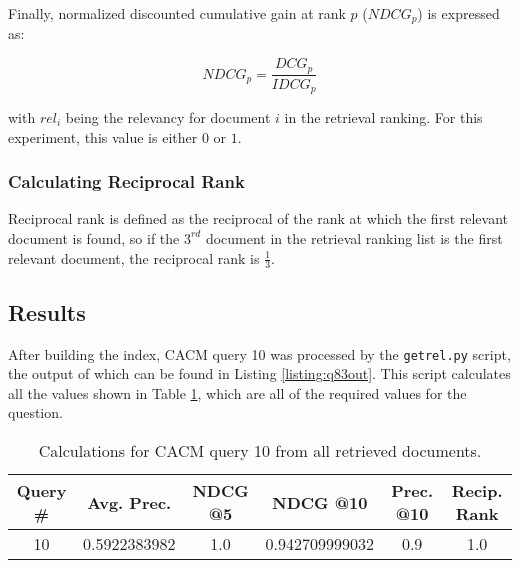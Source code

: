 Finally, normalized discounted cumulative gain at rank \(p\) (\(NDCG_p\)) is expressed as:

\begin{equation}
\nonumber
NDCG_p = \frac{DCG_p}{IDCG_p}
\end{equation}

with \(rel_i\) being the relevancy for document \(i\) in the retrieval ranking.  For this experiment, this value is either \(0\) or \(1\).


\subsubsection{Calculating Reciprocal Rank}
Reciprocal rank is defined as the reciprocal of the rank at which the first relevant document is found, so if the \(3^{rd}\) document in the retrieval ranking list is the first relevant document, the reciprocal rank is \(\frac{1}{3}\).


\subsection{Results}
After building the index, CACM query 10 was processed by the \texttt{getrel.py} script, the output of which can be found in Listing \ref{listing:q83out}.  This script calculates all the values shown in Table \ref{tab:q83}, which are all of the required values for the question.



\begin{table}[h!]
\centering
\begin{tabular}{ | c | c | c | c | c | c | }
\hline
Query \# & Avg. Prec. & NDCG @5 & NDCG @10 & Prec. @10 & Recip. Rank \\
\hline
10 & 0.5922383982 & 1.0 & 0.942709999032 & 0.9 & 1.0 \\
\hline
\end{tabular}
\caption{Calculations for CACM query 10 from all retrieved documents.}
\label{tab:q83}
\end{table}
